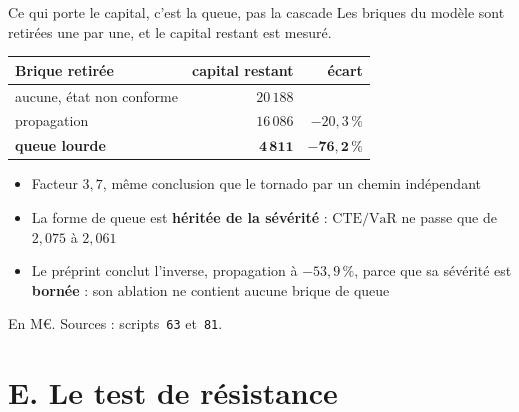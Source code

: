 \documentclass[11pt]{beamer}
\begin{document}
\begin{frame}{Ce qui porte le capital, c'est la queue, pas la cascade}
\small
Les briques du modèle sont retirées une par une, et le capital restant est mesuré.
\vspace{1mm}

\begin{center}\small
\begin{tabular}{@{}l r r@{}}
\toprule
\textbf{Brique retirée} & \textbf{capital restant} & \textbf{écart} \\
\midrule
aucune, état non conforme & $20\,188$ & \\
propagation & $16\,086$ & $-20{,}3\,\%$ \\
\textbf{queue lourde} & $\mathbf{4\,811}$ & $\mathbf{-76{,}2\,\%}$ \\
\bottomrule
\end{tabular}
\end{center}
\vspace{2mm}

\begin{itemize}\itemsep4pt
  \item \alert{Facteur $3{,}7$, même conclusion que le tornado par un chemin indépendant}
  \item La forme de queue est \textbf{héritée de la sévérité} : $\mathrm{CTE}/\mathrm{VaR}$ ne
        passe que de $2{,}075$ à $2{,}061$
  \item Le préprint conclut l'inverse, propagation à $-53{,}9\,\%$, parce que sa sévérité est
        \textbf{bornée} : son ablation ne contient aucune brique de queue
\end{itemize}
\vspace{1mm}
{\scriptsize En M\euro. Sources : scripts~\texttt{63} et~\texttt{81}.}
\end{frame}

\section*{E. Le test de résistance}
\end{document}
